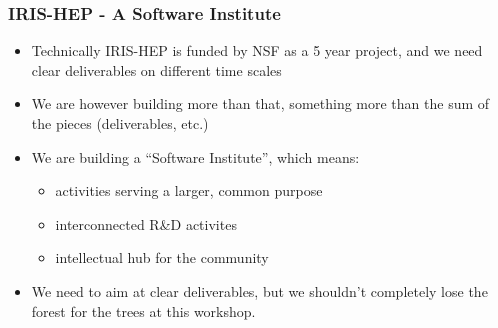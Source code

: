 \begin{frame}
\frametitle{IRIS-HEP - A Software Institute}

\begin{itemize}
\item Technically IRIS-HEP is funded by NSF as a 5 year project, and we need clear deliverables on different time scales
\item We are however building more than that, something more than the sum of the pieces (deliverables, etc.)
\item We are building a ``Software Institute'', which means: 
  \begin{itemize}
  \item activities serving a larger, common purpose 
  \item interconnected R\&D activites
  \item intellectual hub for the community
  \end{itemize}
\item We need to aim at clear deliverables, but we shouldn't completely lose the forest for the trees at this workshop.
\end{itemize}


\end{frame}



